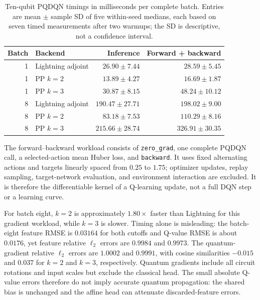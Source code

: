 \documentclass[10pt]{article}
\newcommand{\code}[1]{\texttt{#1}}
\begin{document}
\begin{table}[H]
\centering
\caption{Ten-qubit PQDQN timings in milliseconds per complete batch.  Entries
are mean $\pm$ sample SD of five within-seed medians, each based on seven timed
measurements after two warmups; the SD is descriptive, not a confidence
interval.}
\label{tab:pqdqn-pp-timing}
\small
\begin{tabular}{@{}r l r r@{}}
\toprule
Batch & Backend & Inference & Forward + backward \\
\midrule
1 & Lightning adjoint & $26.90\pm7.44$ & $28.59\pm5.45$ \\
1 & PP $k=2$          & $13.89\pm4.27$ & $16.69\pm1.87$ \\
1 & PP $k=3$          & $30.87\pm8.15$ & $48.24\pm10.12$ \\
8 & Lightning adjoint & $190.47\pm27.71$ & $198.02\pm9.00$ \\
8 & PP $k=2$          & $83.18\pm7.53$ & $110.29\pm8.16$ \\
8 & PP $k=3$          & $215.66\pm28.74$ & $326.91\pm30.35$ \\
\bottomrule
\end{tabular}
\end{table}

The forward--backward workload consists of \code{zero\_grad}, one complete
PQDQN call, a selected-action mean Huber loss, and \code{backward}.  It uses
fixed alternating actions and targets linearly spaced from $0.25$ to $1.75$;
optimizer updates, replay sampling, target-network evaluation, and environment
interaction are excluded.  It is therefore the differentiable kernel of a
Q-learning update, not a full DQN step or a learning curve.

For batch eight, $k=2$ is approximately $1.80\times$ faster than Lightning for
this gradient workload, while $k=3$ is slower.  Timing alone is misleading:
the batch-eight feature RMSE is $0.03164$ for both cutoffs and Q-value RMSE is
about $0.0176$, yet feature relative $\ell_2$ errors are $0.9984$ and $0.9973$.
The quantum-gradient relative $\ell_2$ errors are $1.0002$ and $0.9991$, with
cosine similarities $-0.015$ and $0.037$ for $k=2$ and $k=3$, respectively.
Quantum gradients include all circuit rotations and input scales but exclude
the classical head.  The small absolute Q-value errors therefore do not imply
accurate quantum propagation: the shared bias is unchanged and the affine
head can attenuate discarded-feature errors.
\end{document}
